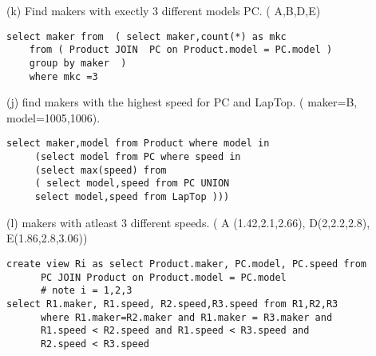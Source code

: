 \documentclass{article}
\begin{document}
(k) Find makers with exectly 3 different models PC. ( A,B,D,E)

\begin{verbatim}
select maker from  ( select maker,count(*) as mkc  
    from ( Product JOIN  PC on Product.model = PC.model )  
    group by maker  ) 
    where mkc =3
\end{verbatim}

(j) find makers with the highest speed for PC and LapTop. ( maker=B, model=1005,1006).

\begin{verbatim}
select maker,model from Product where model in  
     (select model from PC where speed in 
     (select max(speed) from 
     ( select model,speed from PC UNION 
     select model,speed from LapTop )))
\end{verbatim}

(l) makers with atleast 3 different speeds. ( A (1.42,2.1,2.66), D(2,2.2,2.8), E(1.86,2.8,3.06)) 

\begin{verbatim}
create view Ri as select Product.maker, PC.model, PC.speed from
      PC JOIN Product on Product.model = PC.model
      # note i = 1,2,3
select R1.maker, R1.speed, R2.speed,R3.speed from R1,R2,R3 
      where R1.maker=R2.maker and R1.maker = R3.maker and 
      R1.speed < R2.speed and R1.speed < R3.speed and 
      R2.speed < R3.speed
\end{verbatim}
\end{document}
